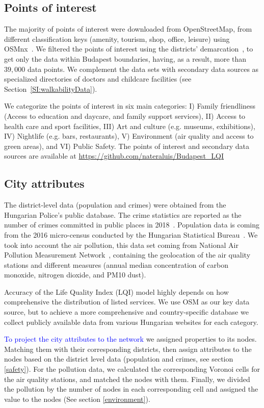 \subsection{Points of interest}
The majority of points of interest were downloaded from OpenStreetMap, from different classification keys (amenity, tourism, shop, office, leisure) using OSMnx~\cite{boeing2017osmnx}. We filtered the points of interest using the districts' demarcation~\cite{HU2019Districts}, to get only the data within Budapest boundaries, having, as a result, more than $39,000$ data points. We complement the data sets with secondary data sources as specialized directories of doctors and childcare facilities (see Section~\ref{SI:walkabilityData}).

We categorize the points of interest in six main categories: I) Family friendliness (Access to education and daycare, and family support services), II) Access to health care and sport facilities, III) Art and culture (e.g. museums, exhibitions), IV) Nightlife (e.g. bars, restaurants), V) Environment (air quality and access to green areas), and VI) Public Safety. The points of interest and secondary data sources are available at \url{https://github.com/nateraluis/Budapest_LQI}

\subsection{City attributes}
The district-level data (population and crimes) were obtained from the Hungarian Police's public database. The crime statistics are reported as the  number of crimes committed in public places in 2018~\cite{HU2019Police}. Population data is coming from the 2016 micro-census conducted by the Hungarian Statistical Bureau~\cite{HU2016Population}. We took into account the air pollution, this data set coming from National Air Pollution Measurement Network~\cite{HU2019Pollution}, containing the geolocation of the air quality stations and different measures (annual median concentration of carbon monoxide, nitrogen dioxide, and PM10 dust).

Accuracy of the Life Quality Index (LQI) model highly depends on how comprehensive the distribution of listed services. We use OSM as our key data source, but to achieve a more comprehensive and country-specific database we collect publicly available data from various Hungarian websites for each category. %

\textcolor{blue}{To project the city attributes to the network }we assigned properties to its nodes. Matching them with their corresponding districts, then assign attributes to the nodes based on the district level data (population and crimes, see section \ref{safety}). For the pollution data, we calculated the corresponding Voronoi cells for the air quality stations, and matched the nodes with them. Finally, we divided the pollution by the number of nodes in each corresponding cell and assigned the value to the nodes (See section \ref{environment}). 


